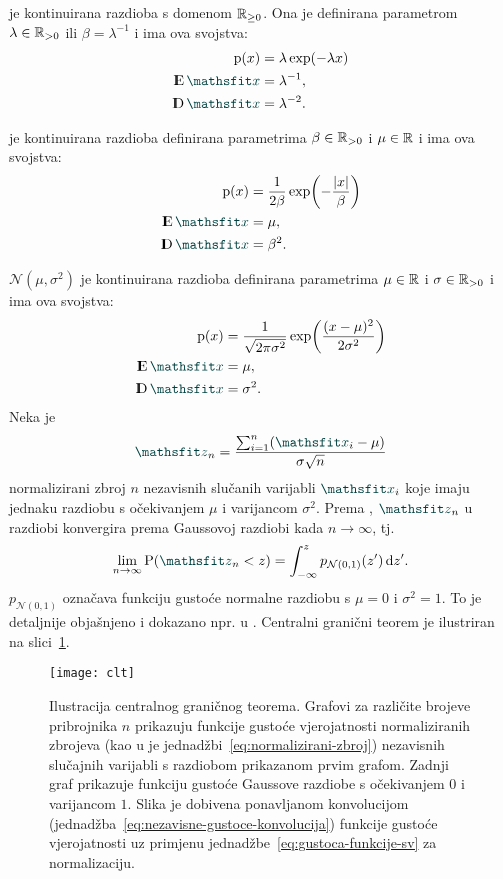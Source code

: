 \documentclass[utf8, diplomski, lmodern]{fer}
\begin{document}
 je kontinuirana razdioba s domenom $\mathbb{R}_{\geq0}$. Ona je definirana parametrom $\lambda\in\mathbb{R}_{>0}$ ili $\beta=\lambda^{-1}$ i ima ova svojstva:
\begin{align}
\p(x) &= \lambda\exp(-\lambda x) \\
\E \rvar x &= \lambda^{-1}, \\
\D \rvar x &= \lambda^{-2} \text{.}
\end{align}

 je kontinuirana razdioba definirana parametrima $\beta\in\mathbb{R}_{>0}$ i $\mu \in \mathbb{R}$ i ima ova svojstva:
\begin{align}
\p(x) &= \frac{1}{2\beta}\exp\del{-\frac{\envert{x}}{\beta}} \\
\E \rvar x &= \mu, \\
\D \rvar x &= \beta^2 \text{.}
\end{align}

 $\mathcal{N}(\mu,\sigma^2)$ je kontinuirana razdioba definirana parametrima $\mu\in\mathbb{R}$ i $\sigma \in \mathbb{R}_{>0}$ i ima ova svojstva:
\begin{align}
\p(x) &= \frac{1}{\sqrt{2\pi\sigma^2}}\exp\del{\frac{\del{x-\mu}^2}{2\sigma^2}} \\
\E \rvar x &= \mu, \\
\D \rvar x &= \sigma^2 \text{.}
\end{align}
Neka je 
\begin{align} \label{eq:normalizirani-zbroj}
\rvar z_n = \frac{\sum_{i=1}^n \del{\rvar x_i-\mu}}{\sigma\sqrt{n}}
\end{align}
normalizirani zbroj $n$ nezavisnih slučanih varijabli $\rvar x_i$ koje imaju jednaku razdiobu s očekivanjem $\mu$ i varijancom $\sigma^2$. Prema , $\rvar z_n$ u razdiobi konvergira prema Gaussovoj razdiobi kada $n\to\infty$, tj.
\begin{align}
\lim_{n\to\infty} \P(\rvar z_n<z) = \int_{-\infty}^{z} p_{\mathcal{N}(0,1)}(z')\dif{z'} \text{.}
\end{align}
$p_{\mathcal{N}(0,1)}$ označava funkciju gustoće normalne razdiobu s $\mu=0$ i $\sigma^2=1$. To je detaljnije objašnjeno i dokazano npr. u \citet{Elezovic:2007:VSSV}. Centralni granični teorem je ilustriran na slici~\ref{fig:clt}.

\begin{figure}
	\centering
	\texttt{[image: clt]}
	\caption{Ilustracija centralnog graničnog teorema. Grafovi za različite brojeve pribrojnika $n$ prikazuju funkcije gustoće vjerojatnosti normaliziranih zbrojeva (kao u je jednadžbi~\eqref{eq:normalizirani-zbroj}) nezavisnih slučajnih varijabli s razdiobom prikazanom prvim grafom. Zadnji graf prikazuje funkciju gustoće Gaussove razdiobe s očekivanjem $0$ i varijancom $1$. Slika je dobivena ponavljanom konvolucijom (jednadžba~\eqref{eq:nezavisne-gustoce-konvolucija}) funkcije gustoće vjerojatnosti uz primjenu jednadžbe~\eqref{eq:gustoca-funkcije-sv} za normalizaciju.
	}
	\label{fig:clt}
\end{figure}
\end{document}
